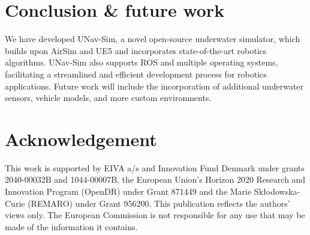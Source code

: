 \section{Conclusion \& future work} \label{sec:conclusion}
We have developed UNav-Sim, a novel open-source underwater simulator, which builds upon AirSim and \ac{UE5} and incorporates state-of-the-art robotics algorithms. UNav-Sim also supports \ac{ROS} and multiple operating systems, facilitating a streamlined and efficient development process for robotics applications. Future work will include the incorporation of additional underwater sensors, vehicle models, and more custom environments. 



\section*{Acknowledgement}
This work is supported by EIVA a/s and Innovation Fund Denmark under grants 2040-00032B and 1044-00007B, the European Union’s Horizon 2020 Research and Innovation Program (OpenDR) under Grant 871449 and the Marie Skłodowska-Curie (REMARO) under Grant 956200. This publication reflects the authors’ views only. The European Commission is not responsible for any use that may be made of the information it contains.
